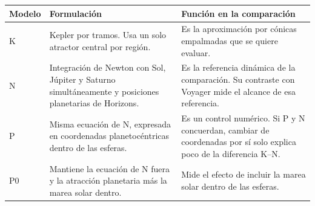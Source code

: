 \documentclass[11pt,letterpaper]{article}
\begin{document}
\begin{center}\small
\begin{tabular}{@{}p{.10\linewidth}p{.40\linewidth}p{.44\linewidth}@{}}
\toprule
Modelo & Formulación & Función en la comparación\\
\midrule
K & Kepler por tramos. Usa un solo atractor central por región. & Es la aproximación por cónicas empalmadas que se quiere evaluar.\\
N & Integración de Newton con Sol, Júpiter y Saturno simultáneamente y posiciones planetarias de Horizons. & Es la referencia dinámica de la comparación. Su contraste con Voyager mide el alcance de esa referencia.\\
P & Misma ecuación de N, expresada en coordenadas planetocéntricas dentro de las esferas. & Es un control numérico. Si P y N concuerdan, cambiar de coordenadas por sí solo explica poco de la diferencia K--N.\\
P0 & Mantiene la ecuación de N fuera y la atracción planetaria más la marea solar dentro. & Mide el efecto de incluir la marea solar dentro de las esferas.\\
\bottomrule
\end{tabular}
\end{center}
\end{document}
